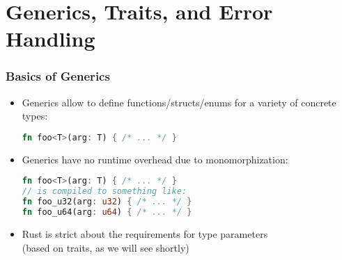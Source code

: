  \section{Generics, Traits, and Error Handling}

\begin{frame}[fragile]
    \frametitle{Basics of Generics}

    \begin{itemize}
        \item Generics allow to define functions/structs/enums for a variety of concrete types:
        \begin{lstlisting}[language=rust]
fn foo<T>(arg: T) { /* ... */ }
        \end{lstlisting}
        \item Generics have no runtime overhead due to monomorphization:
        \begin{lstlisting}[language=rust]
fn foo<T>(arg: T) { /* ... */ }
// is compiled to something like:
fn foo_u32(arg: u32) { /* ... */ }
fn foo_u64(arg: u64) { /* ... */ }
        \end{lstlisting}
        \item Rust is strict about the requirements for type parameters\\
        (based on traits, as we will see shortly)
    \end{itemize}
\end{frame}

